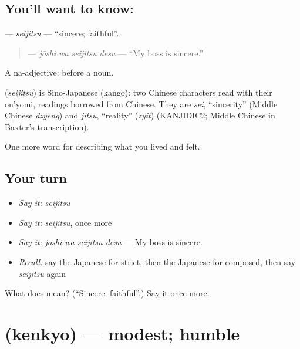\subsection*{You'll want to know: }
\textbf{} — \emph{seijitsu} — \textquotedblleft{}sincere; faithful\textquotedblright{}.

\begin{quote}
\textbf{ } — \emph{jōshi wa seijitsu desu} — \textquotedblleft{}My boss is sincere.\textquotedblright{}
\end{quote}

A na-adjective:  before a noun.

\begin{cousinweb}
\textbf{} (\emph{seijitsu}) is Sino-Japanese (kango): two Chinese characters read with their on'yomi, readings borrowed from Chinese. They are \emph{sei}, \textquotedblleft{}sincerity\textquotedblright{} (Middle Chinese \emph{dzyeng}) and \emph{jitsu}, \textquotedblleft{}reality\textquotedblright{} (\emph{zyit}) (KANJIDIC2; Middle Chinese in Baxter's transcription).
\end{cousinweb}

\begin{grammarlens}[title={What you've built}]
One more word for describing what you lived and felt.
\end{grammarlens}

\subsection*{Your turn}
\begin{itemize}
\raggedright
  \item \emph{Say it:} \emph{seijitsu}
  \item \emph{Say it:} \emph{seijitsu}, once more
  \item \emph{Say it:} \emph{jōshi wa seijitsu desu} — My boss is sincere.
  \item \emph{Recall:} say the Japanese for strict, then the Japanese for composed, then say \emph{seijitsu} again
\end{itemize}

\begin{tcolorbox}[breakable,colback=teal!4,colframe=teal!35!black,title={Before you move on}]
What does  mean? (\textquotedblleft{}Sincere; faithful\textquotedblright{}.) Say it once more.
\end{tcolorbox}
\section[\texorpdfstring{\ja{けんきょ} (kenkyo)}{けんきょ (kenkyo)}]{ (kenkyo) — modest; humble}

